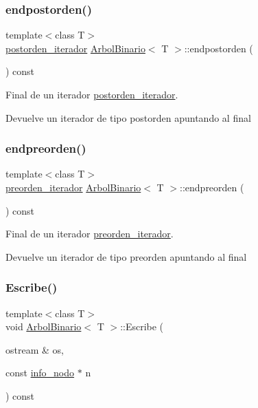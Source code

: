 \subsubsection{\texorpdfstring{endpostorden()}{endpostorden()}}
{\footnotesize\ttfamily template$<$class T$>$ \\
\hyperlink{classArbolBinario_1_1postorden__iterador}{postorden\+\_\+iterador} \hyperlink{classArbolBinario}{Arbol\+Binario}$<$ T $>$\+::endpostorden (\begin{DoxyParamCaption}{ }\end{DoxyParamCaption}) const}



Final de un iterador \hyperlink{classArbolBinario_1_1postorden__iterador}{postorden\+\_\+iterador}. 

\begin{DoxyReturn}{Devuelve}
un iterador de tipo postorden apuntando al final 
\end{DoxyReturn}
\mbox{\label{classArbolBinario_ad1c64408fd252fa134125d7ca5717e3a}} 
\subsubsection{\texorpdfstring{endpreorden()}{endpreorden()}}
{\footnotesize\ttfamily template$<$class T$>$ \\
\hyperlink{classArbolBinario_1_1preorden__iterador}{preorden\+\_\+iterador} \hyperlink{classArbolBinario}{Arbol\+Binario}$<$ T $>$\+::endpreorden (\begin{DoxyParamCaption}{ }\end{DoxyParamCaption}) const}



Final de un iterador \hyperlink{classArbolBinario_1_1preorden__iterador}{preorden\+\_\+iterador}. 

\begin{DoxyReturn}{Devuelve}
un iterador de tipo preorden apuntando al final 
\end{DoxyReturn}
\mbox{\label{classArbolBinario_a7f3b03ed5ed75ad3ea38c18f93470616}} 
\subsubsection{\texorpdfstring{Escribe()}{Escribe()}}
{\footnotesize\ttfamily template$<$class T$>$ \\
void \hyperlink{classArbolBinario}{Arbol\+Binario}$<$ T $>$\+::Escribe (\begin{DoxyParamCaption}\item[{ostream \&}]{os,  }\item[{const \hyperlink{structArbolBinario_1_1info__nodo}{info\+\_\+nodo} $\ast$}]{n }\end{DoxyParamCaption}) const\hspace{0.3cm}{\ttfamily [private]}}



